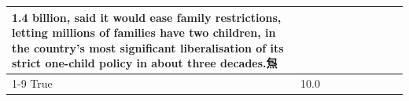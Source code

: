 \begin{table}[H]
\begin{tabular}{lllrlllll}
1.4 billion, said it would ease family restrictions, letting millions of families have two children, in the country's most significant liberalisation of its strict one-child policy in about three decades.炰 \\
\cline{1-9}
True & 10.0%
\end{tabular}
\end{table}
